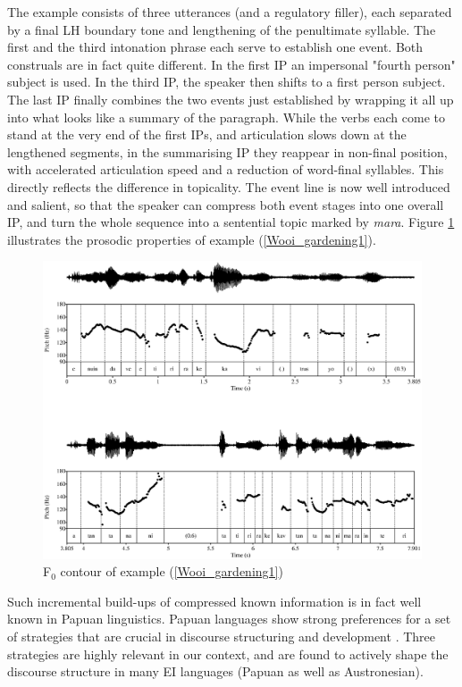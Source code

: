 The example consists of three utterances (and a regulatory filler), each separated by a final LH boundary tone and lengthening of the penultimate syllable. The first and the third intonation phrase each serve to establish one event. Both construals are in fact quite different. In the first IP an impersonal "fourth person" subject is used. In the third IP, the speaker then shifts to a first person subject. The last IP finally combines the two events just established by wrapping it all up into what looks like a summary of the paragraph. While the verbs each come to stand at the very end of the first IPs, and articulation slows down at the lengthened segments, in the summarising IP they reappear in non-final position, with accelerated articulation speed and a reduction of word-final syllables. This directly reflects the difference in topicality. The event line is now well introduced and salient, so that the speaker can compress both event stages into one overall IP, and turn the whole sequence into a sentential topic marked by \textit{mara}. Figure \ref{fig:gardening_pitch} illustrates the prosodic properties of example (\ref{Wooi_gardening1}).

\begin{figure}
\includegraphics[width=1.2\textwidth]{figures/gardening1_burnplant.eps} 
\caption{F$_0$ contour of example (\ref{Wooi_gardening1})}\label{fig:gardening_pitch}
\end{figure}

Such incremental build-ups of compressed known information is in fact well known in Papuan linguistics. Papuan languages show strong preferences for a set of strategies that are crucial in discourse structuring and development \citep{devries2005towards, devries2006areal}. Three strategies are highly relevant in our context, and are found to actively shape the discourse structure in many EI languages (Papuan as well as Austronesian). 

